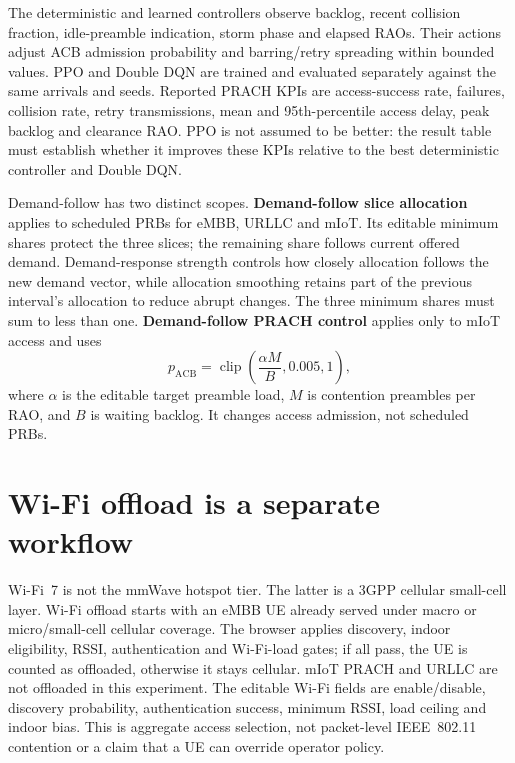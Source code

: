\documentclass[10pt]{article}
\begin{document}
The deterministic and learned controllers observe backlog, recent collision fraction, idle-preamble indication, storm phase and elapsed RAOs. Their actions adjust ACB admission probability and barring/retry spreading within bounded values. PPO and Double DQN are trained and evaluated separately against the same arrivals and seeds. Reported PRACH KPIs are access-success rate, failures, collision rate, retry transmissions, mean and 95th-percentile access delay, peak backlog and clearance RAO. PPO is not assumed to be better: the result table must establish whether it improves these KPIs relative to the best deterministic controller and Double DQN.

Demand-follow has two distinct scopes. \textbf{Demand-follow slice allocation} applies to scheduled PRBs for eMBB, URLLC and mIoT. Its editable minimum shares protect the three slices; the remaining share follows current offered demand. Demand-response strength controls how closely allocation follows the new demand vector, while allocation smoothing retains part of the previous interval's allocation to reduce abrupt changes. The three minimum shares must sum to less than one. \textbf{Demand-follow PRACH control} applies only to mIoT access and uses
\[
p_{\mathrm{ACB}}=\operatorname{clip}\!\left(\frac{\alpha M}{B},0.005,1\right),
\]
where $\alpha$ is the editable target preamble load, $M$ is contention preambles per RAO, and $B$ is waiting backlog. It changes access admission, not scheduled PRBs.

\section{Wi-Fi offload is a separate workflow}
Wi-Fi~7 is not the mmWave hotspot tier. The latter is a 3GPP cellular small-cell layer. Wi-Fi offload starts with an eMBB UE already served under macro or micro/small-cell cellular coverage. The browser applies discovery, indoor eligibility, RSSI, authentication and Wi-Fi-load gates; if all pass, the UE is counted as offloaded, otherwise it stays cellular. mIoT PRACH and URLLC are not offloaded in this experiment. The editable Wi-Fi fields are enable/disable, discovery probability, authentication success, minimum RSSI, load ceiling and indoor bias. This is aggregate access selection, not packet-level IEEE~802.11 contention or a claim that a UE can override operator policy.
\end{document}
